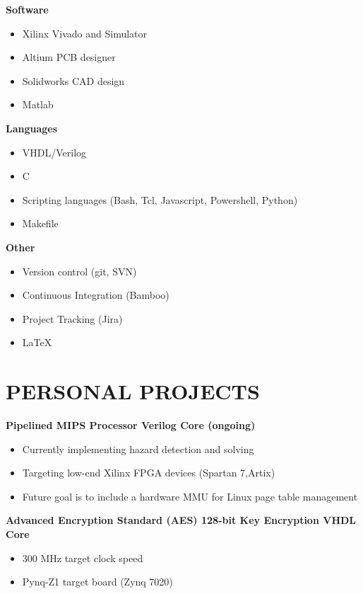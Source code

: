 \documentclass{res}
\begin{document}
\begin{resume}
  \newpage

  {\bf Software}
    \begin{itemize}[noitemsep]
      \item Xilinx Vivado and Simulator
      \item Altium PCB designer
      \item Solidworks CAD design
      \item Matlab
    \end{itemize}

  {\bf Languages}
    \begin{itemize}[noitemsep]
      \item VHDL/Verilog
      \item C
      \item Scripting languages (Bash, Tcl, Javascript, Powershell, Python)
      \item Makefile
    \end{itemize}

  {\bf Other}
    \begin{itemize}[noitemsep]
      \item Version control (git, SVN)
      \item Continuous Integration (Bamboo)
      \item Project Tracking (Jira)
      \item \LaTeX
    \end{itemize}

\section{PERSONAL PROJECTS}
\vspace{0.1in}
  
  {\bf Pipelined MIPS Processor Verilog Core (ongoing)}
  \begin{itemize}
    \item Currently implementing hazard detection and solving
    \item Targeting low-end Xilinx FPGA devices (Spartan 7,Artix)
    \item Future goal is to include a hardware MMU for Linux page table management
  \end{itemize}

  {\bf Advanced Encryption Standard (AES) 128-bit Key Encryption VHDL Core}
    \begin{itemize}
      \item 300 MHz target clock speed
      \item Pynq-Z1 target board (Zynq 7020)
    \end{itemize}


\end{resume}
\end{document}

